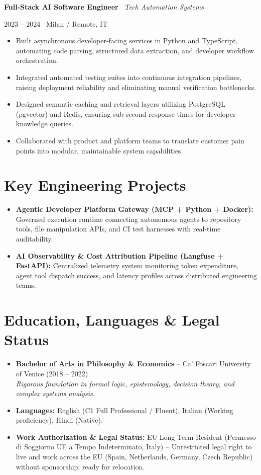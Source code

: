 \documentclass[a4paper,10pt]{article}
\newcommand{\role}[4]{%
  \vspace{2pt}\noindent
  \begin{minipage}[t]{0.70\textwidth}\raggedright\textbf{#1} \textbullet\ \textit{#3}\end{minipage}%
  \hfill
  \begin{minipage}[t]{0.28\textwidth}\raggedleft\footnotesize\color{gray}#2 \textbullet\ #4\end{minipage}%
  \vspace{1pt}%
}
\begin{document}
\vspace{3pt}
\role{Full-Stack AI Software Engineer}{2023 -- 2024}{Tech Automation Systems}{Milan / Remote, IT}
\begin{itemize}
  \item Built asynchronous developer-facing services in Python and TypeScript, automating code parsing, structured data extraction, and developer workflow orchestration.
  \item Integrated automated testing suites into continuous integration pipelines, raising deployment reliability and eliminating manual verification bottlenecks.
  \item Designed semantic caching and retrieval layers utilizing PostgreSQL (pgvector) and Redis, ensuring sub-second response times for developer knowledge queries.
  \item Collaborated with product and platform teams to translate customer pain points into modular, maintainable system capabilities.
\end{itemize}

\section{Key Engineering Projects}
\begin{itemize}
  \item \textbf{Agentic Developer Platform Gateway (MCP + Python + Docker):} Governed execution runtime connecting autonomous agents to repository tools, file manipulation APIs, and CI test harnesses with real-time auditability.
  \item \textbf{AI Observability \& Cost Attribution Pipeline (Langfuse + FastAPI):} Centralized telemetry system monitoring token expenditure, agent tool dispatch success, and latency profiles across distributed engineering teams.
\end{itemize}

\section{Education, Languages \& Legal Status}
\begin{itemize}
  \item \textbf{Bachelor of Arts in Philosophy \& Economics} -- Ca' Foscari University of Venice (2018 -- 2022) \\
  \textit{Rigorous foundation in formal logic, epistemology, decision theory, and complex systems analysis.}
  \item \textbf{Languages:} English (C1 Full Professional / Fluent), Italian (Working proficiency), Hindi (Native).
  \item \textbf{Work Authorization \& Legal Status:} EU Long-Term Resident (Permesso di Soggiorno UE a Tempo Indeterminato, Italy) -- Unrestricted legal right to live and work across the EU (Spain, Netherlands, Germany, Czech Republic) without sponsorship; ready for relocation.
\end{itemize}
\end{document}
